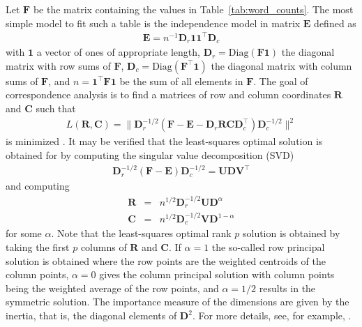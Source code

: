 \documentclass[article]{jdssv}
\newcommand{\ma}[1]{\ensuremath{\mathbf{#1}}}
\begin{document}
Let $\ma{F}$ be the matrix containing the values in Table~\ref{tab:word_counts}. The most simple model to fit such a table is the independence model in matrix $\ma{E}$ defined as 
\begin{eqnarray*}
  \ma{E} = n^{-1}\ma{D}_r \ma{11}^\top \ma{D}_c
\end{eqnarray*}
with $\ma{1}$ a vector of ones of appropriate length, $\ma{D}_r = \textrm{Diag}(\ma{F1})$ the diagonal matrix with row sums of $\ma{F}$, $\ma{D}_c = \textrm{Diag}(\ma{F^\top1})$ the diagonal matrix with column sums of $\ma{F}$, and $n = \ma{1^\top F1}$ be the sum of all elements in $\ma{F}$. The goal of correspondence analysis is to find a matrices of row and column coordinates $\ma{R}$ and $\ma{C}$ such that
\begin{eqnarray*}
  L(\ma{R}, \ma{C}) = \|\ma{D}_r^{-1/2} (\ma{F} - \ma{E} - \ma{D}_r\ma{RC}\ma{D}_c^\top) \ma{D}_c^{-1/2}\|^2
\end{eqnarray*}
is minimized \citep[see, for example,][]{vandeveldenetal2009seriation}. It may be verified that the least-squares optimal solution is obtained for by computing the singular value decomposition (SVD) 
\begin{eqnarray*}
  \ma{D}_r^{-1/2} (\ma{F} - \ma{E})\ma{D}_c^{-1/2} = \ma{UDV}^\top
\end{eqnarray*}
and computing
\begin{eqnarray*}
  \ma{R} &=& n^{1/2}\ma{D}_r^{-1/2} \ma{UD}^{\alpha}\\
  \ma{C} &=& n^{1/2}\ma{D}_c^{-1/2} \ma{VD}^{1-\alpha}
\end{eqnarray*}
for some $\alpha$. Note that the least-squares optimal rank $p$ solution is obtained by taking the first $p$ columns of $\ma{R}$ and $\ma{C}$. If $\alpha = 1$ the so-called row principal solution is obtained where the row points are the weighted centroids of the column points, $\alpha = 0$ gives the column principal solution with column points being the weighted average of the row points, and $\alpha = 1/2$ results in the symmetric solution. The importance measure of the dimensions are given by the inertia, that is, the diagonal elements of $\ma{D}^2$. For more details, see, for example, \cite{greenacre2010biplots}.
\end{document}
